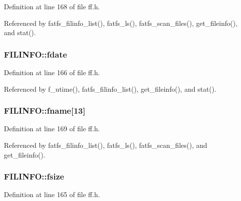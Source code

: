 Definition at line 168 of file ff.\-h.



Referenced by fatfs\-\_\-filinfo\-\_\-list(), fatfs\-\_\-ls(), fatfs\-\_\-scan\-\_\-files(), get\-\_\-fileinfo(), and stat().

\hypertarget{structFILINFO_a7c01c48a15b1b49da459924437b0bd52}{
\subsubsection[{fdate}]{ F\-I\-L\-I\-N\-F\-O\-::fdate}}\label{structFILINFO_a7c01c48a15b1b49da459924437b0bd52}


Definition at line 166 of file ff.\-h.



Referenced by f\-\_\-utime(), fatfs\-\_\-filinfo\-\_\-list(), get\-\_\-fileinfo(), and stat().

\hypertarget{structFILINFO_abd852510f2f79b4ec773156d8942dc7c}{
\subsubsection[{fname}]{ F\-I\-L\-I\-N\-F\-O\-::fname\mbox{[}13\mbox{]}}}\label{structFILINFO_abd852510f2f79b4ec773156d8942dc7c}


Definition at line 169 of file ff.\-h.



Referenced by fatfs\-\_\-filinfo\-\_\-list(), fatfs\-\_\-ls(), fatfs\-\_\-scan\-\_\-files(), and get\-\_\-fileinfo().

\hypertarget{structFILINFO_aee7441af7dc0c443d1e1e6011cc7dcac}{
\subsubsection[{fsize}]{ F\-I\-L\-I\-N\-F\-O\-::fsize}}\label{structFILINFO_aee7441af7dc0c443d1e1e6011cc7dcac}


Definition at line 165 of file ff.\-h.



